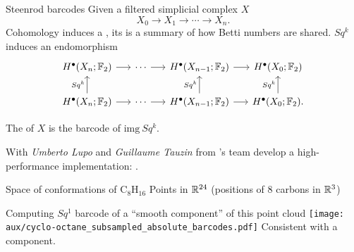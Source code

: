\begin{frame}[fragile]{Steenrod barcodes}
	Given a filtered simplicial complex $X$
	\[
	X_0 \to X_1 \to \cdots \to X_n.
	\]
	Cohomology induces a , its  is a summary of how Betti numbers are shared.
	$Sq^k$ induces an endomorphism
	\[
	\begin{tikzcd}[column sep = 15]
	H^\bullet(X_n; \Ftwo) \arrow[r] & \cdots \arrow[r] & H^\bullet(X_{n-1}; \Ftwo) \arrow[r] & H^\bullet(X_0; \Ftwo) \\
	H^\bullet(X_n; \Ftwo) \arrow[u, "Sq^k"] \arrow[r] & \cdots \arrow[r] & H^\bullet(X_{n-1}; \Ftwo) \arrow[u, "Sq^k"] \arrow[r] & H^\bullet(X_0; \Ftwo) \arrow[u, "Sq^k"].
	\end{tikzcd}
	\]

	\pause
	The  of $X$ is the barcode of $\mathrm{img}\ Sq^k$.

	\bigskip\pause
	With \textit{Umberto Lupo} and \textit{Guillaume Tauzin} from 's team
	\medskip
	develop a high-performance implementation: .
\end{frame}

%

\begin{frame}{Space of conformations of $\mathrm{C_8H_{16}}$}
	Points in $\mathbb{R}^{24}$ (positions of $8$ carbons in $\mathbb{R}^3$)

	\pause\smallskip
	Computing $Sq^1$ barcode of a ``smooth component'' of this point cloud
	\smallskip
	\texttt{[image: aux/cyclo-octane\_subsampled\_absolute\_barcodes.pdf]}
	Consistent with a  component.
\end{frame}

